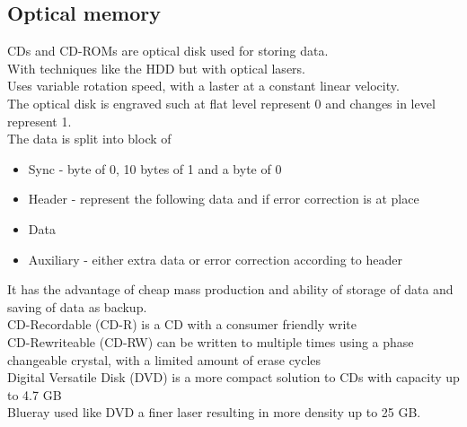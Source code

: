 \documentclass[12pt, a4paper]{article}
\begin{document}
		\subsection{Optical memory}
			CDs and CD-ROMs are optical disk used for storing data.\\
			With techniques like the HDD but with optical lasers.\\
			Uses variable rotation speed, with a laster at a constant linear velocity.\\
			The optical disk is engraved such at flat level represent 0 and changes in level represent 1.\\
			The data is split into block of
			\begin{itemize}
				\item Sync - byte of 0, 10 bytes of 1 and a byte of 0
				\item Header - represent the following data and if error correction is at place
				\item Data
				\item Auxiliary - either extra data or error correction according to header
			\end{itemize}
			It has the advantage of cheap mass production and ability of storage of data and saving of data as backup.\\
			CD-Recordable (CD-R) is a CD with a consumer friendly write \\
			CD-Rewriteable (CD-RW) can be written to multiple times using a phase changeable crystal, with a limited amount of erase cycles\\
			Digital Versatile Disk (DVD) is a more compact solution to CDs with capacity up to 4.7 GB\\
			Blueray used like DVD a finer laser resulting in more density up to 25 GB.
\end{document}
